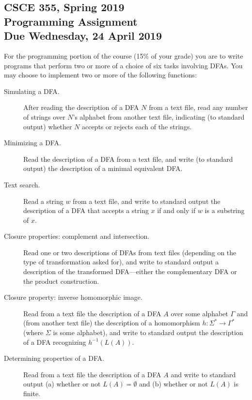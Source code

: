 \begin{center}
\section*{CSCE 355, Spring 2019 \\
Programming Assignment\\
Due Wednesday, 24 April 2019
}
\end{center}

For the programming portion of the course (15\% of your grade) you are to write
programs that perform two or more of a choice of six tasks involving DFAs.
You may choose to implement two or more of the following functions:

\begin{description}
\item[Simulating a DFA\@.]
After reading the description of a DFA $N$ from a text file, read any
number of strings over $N$'s alphabet from another text file,
indicating (to standard output) whether $N$ accepts or rejects
each of the strings.

\item[Minimizing a DFA\@.]
Read the description of a DFA from a text file, and write (to standard
output) the description of a minimal equivalent DFA\@.

\item[Text search.]
Read a string $w$ from a text file, and write to standard output the
description of a DFA that accepts a string $x$ if and only if $w$ is a substring of $x$.

\item[Closure properties: complement and intersection.]
Read one or two descriptions of DFAs from text files (depending on the
type of transformation asked for), and write to standard output a
description of the transformed DFA---either the complementary DFA or
the product construction.

\item[Closure property: inverse homomorphic image.]
Read from a text file the description of a DFA $A$ over some alphabet
$\Gamma$ and (from another text file) the description of a
homomorphism
$h:\Sigma^*\rightarrow\Gamma^*$
(where $\Sigma$ is some alphabet), and write to standard output the
description of a DFA recognizing $h^{-1}(L(A))$.

\item[Determining properties of a DFA\@.]
Read from a text file the description of a DFA $A$ and write to
standard output (a) whether or not $L(A) = \emptyset$ and
(b) whether or not $L(A)$ is finite.
\end{description}

